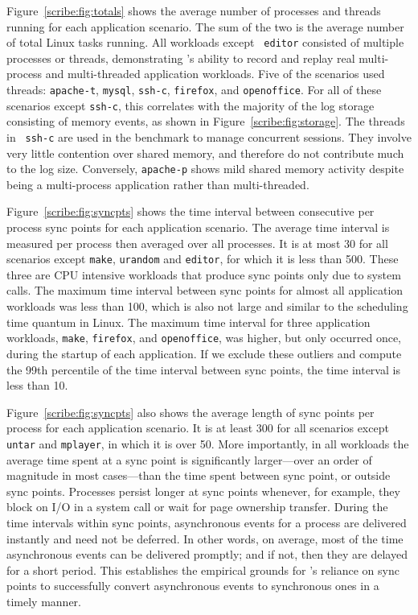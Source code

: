 Figure~\ref{scribe:fig:totals} shows the average number of processes and
threads running for each application scenario.  The sum of the two is
the average number of total Linux tasks running.  All workloads except {\tt
  editor} consisted of multiple processes or threads, demonstrating
\scribe{}'s ability to record and replay real multi-process and
multi-threaded application workloads.  Five of the scenarios used
threads: {\tt apache-t}, {\tt mysql}, {\tt ssh-c}, {\tt firefox}, and 
{\tt openoffice}. For all of these scenarios except {\tt ssh-c}, this
correlates with the majority of the log storage consisting of memory
events, as shown in Figure~\ref{scribe:fig:storage}.  The threads in {\tt
  ssh-c} are
used in the benchmark to manage
concurrent sessions.  They involve very little contention over shared
memory, and therefore do not contribute much to the log size.
Conversely, {\tt apache-p} shows mild shared memory activity despite
being a multi-process application rather than multi-threaded. 

Figure~\ref{scribe:fig:syncpts} shows the time interval between consecutive
per process sync points for each application scenario. The average
time interval is measured per process then averaged over all
processes.  It is at most 30\us{} for all scenarios except {\tt make},
{\tt urandom} and {\tt editor}, for which it is less than 500\us{}.
These three are CPU intensive workloads that produce sync points only
due to system calls.
The maximum time interval between sync points for almost all
application workloads was less than 100\ms{}, which is also not large
and similar to the scheduling time quantum in Linux.  The maximum time
interval for three application workloads, {\tt make}, {\tt firefox},
and {\tt openoffice}, was higher, but only occurred once,
during the startup of each application.  If we exclude these outliers
and compute the 99th percentile of the time interval between sync
points, the time interval is less than 10\ms{}.

Figure~\ref{scribe:fig:syncpts} also shows the average length of sync points
per process for each application scenario. It is at least 300\us{} for
all scenarios except {\tt untar} and {\tt mplayer}, in which it is
over 50\us{}. More importantly, in all workloads the average time
spent at a sync point is significantly larger---over an order of
magnitude in most cases---than the time spent between sync point, or
outside sync points. Processes persist longer at sync points whenever,
for example, they block on I/O in a system call or wait for page
ownership transfer. During the time intervals within sync points,
asynchronous events for a process are delivered instantly and need not
be deferred. In other words, on average, most of the time asynchronous
events can be delivered promptly; and if not, then they are delayed
for a short period.  This establishes the empirical grounds for
\scribe{}'s reliance on sync points to successfully convert
asynchronous events to synchronous ones in a timely manner.

